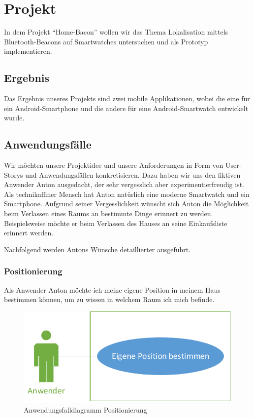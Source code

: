 \section{Projekt}

In dem Projekt "`Home-Bacon"' wollen wir das Thema Lokalisation mittels Bluetooth-Beacons auf Smartwatches untersuchen und als Prototyp implementieren.

\subsection{Ergebnis}
Das Ergebnis unseres Projekts sind zwei mobile Applikationen, wobei die eine für ein Android-Smartphone und die andere für eine Android-Smartwatch entwickelt wurde.

\subsection{Anwendungsfälle}
\label{sec:useCases}
Wir möchten unsere Projektidee und unsere Anforderungen in Form von User-Storys und Anwendungsfällen konkretisieren. Dazu haben wir uns den fiktiven Anwender Anton ausgedacht, der sehr vergesslich aber experimentierfreudig ist. Als technikaffiner Mensch hat Anton natürlich eine moderne Smartwatch und ein Smartphone. Aufgrund seiner Vergesslichkeit wünscht sich Anton die Möglichkeit beim Verlassen eines Raums an bestimmte Dinge erinnert zu werden. Beispielsweise möchte er beim Verlassen des Hauses an seine Einkaufsliste erinnert werden.

Nachfolgend werden Antons Wünsche detaillierter ausgeführt.

\subsubsection{Positionierung}
Als Anwender Anton möchte ich meine eigene Position in meinem Haus bestimmen können, um zu wissen in welchem Raum ich mich befinde. 

\begin{figure}[H]
\centering
\includegraphics[width=0.54\linewidth]{Bilder/UseCase-Position}
\caption{Anwendungsfalldiagramm Positionierung}
\label{fig:UseCase-Position}
\end{figure}

